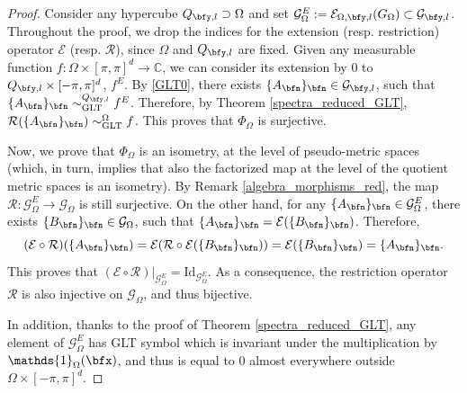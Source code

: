 \documentclass{amsart}
\begin{document}
\begin{proof}
    
    Consider any hypercube $Q_{\bfy,l}\supset\Omega$ and set $\mathcal{G}_\Omega^E:=\mathcal{E}_{\Omega,\bfy,l}(G_\Omega)\subset\mathcal{G}_{\bfy,l}$. Throughout the proof, we drop the indices for the extension (resp. restriction) operator $\mathcal{E}$ (resp. $\mathcal{R}$), since $\Omega$ and $Q_{\bfy,l}$ are fixed. Given any measurable function $f:\Omega\times[\pi,\pi]^d\to\mathbb{C}$, we can consider its extension by $0$ to $Q_{\bfy,l} \times [-\pi,\pi]^d$, $f^E$. By \ref{GLT0}, there exists $\{A_\bfn\}_\bfn\in\mathcal{G}_{\bfy,l}$, such that $\{A_\bfn\}_\bfn\sim_{\mathrm{GLT}}^{Q_{\bfy,l}}f^E$. Therefore, by Theorem \ref{spectra_reduced_GLT}, $\mathcal{R}(\{A_\bfn\}_\bfn)\sim_{\mathrm{GLT}}^{\Omega}f$. This proves that $\Phi_\Omega$ is surjective.

    Now, we prove that $\Phi_\Omega$ is an isometry, at the level of pseudo-metric spaces (which, in turn, implies that also the factorized map at the level of the quotient metric spaces is an isometry).
    By Remark \ref{algebra_morphisms_red}, the map $\mathcal{R}:\mathcal{G}_\Omega^E\to\mathcal{G}_\Omega$ is still surjective. On the other hand, for any $\{A_\bfn\}_\bfn\in\mathcal{G}_\Omega^E$, there exists $\{B_\bfn\}_\bfn\in\mathcal{G}_\Omega$, such that $\{A_\bfn\}_\bfn=\mathcal{E}(\{B_\bfn\}_\bfn)$. Therefore,
    \begin{equation*}
        (\mathcal{E}\circ\mathcal{R})(\{A_\bfn\}_\bfn)=\mathcal{E}(\mathcal{R}\circ\mathcal{E}(\{B_\bfn\}_\bfn))=\mathcal{E}(\{B_\bfn\}_\bfn)=\{A_\bfn\}_\bfn.
    \end{equation*}
    This proves that $(\mathcal{E}\circ\mathcal{R})|_{\mathcal{G}_\Omega^E}=\mathrm{Id}_{\mathcal{G}_\Omega^E}$.
    As a consequence, the restriction operator $\mathcal{R}$ is also injective on $\mathcal{G}_\Omega$, and thus bijective.
    
    In addition, thanks to the proof of Theorem \ref{spectra_reduced_GLT}, any element of $\mathcal{G}_\Omega^E$ has GLT symbol which is invariant under the multiplication by $\mathds{1}_\Omega(\bfx)$, and thus is equal to 0 almost everywhere outside $\Omega\times[-\pi,\pi]^d$.
    

\end{proof}
\end{document}
